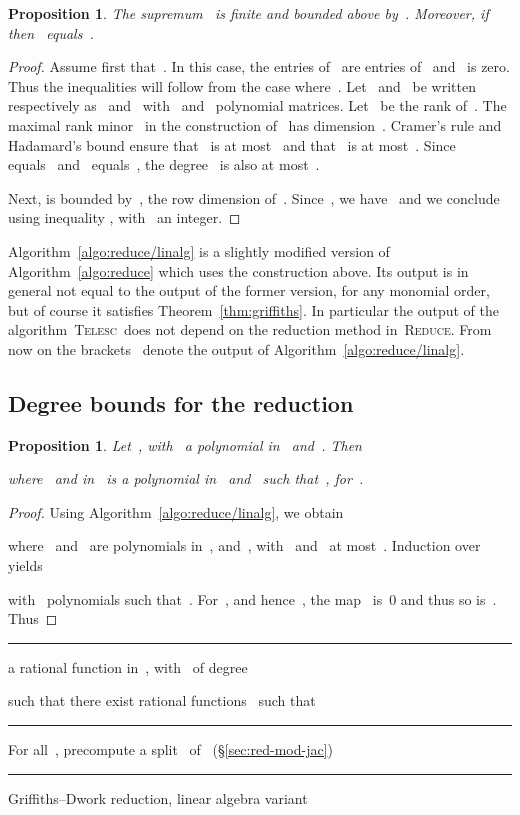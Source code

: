 \documentclass{sig-alternate}
\newtheorem{prop}[thm]{Proposition}
\newenvironment{algoenv}[3][\linewidth]{
\begin{minipage}{#1}\flushleft
\rule{\textwidth}{.08em}\vspace{-\baselineskip}\smallskip
\begin{description}[noitemsep]
\item[\rlap{Input}\phantom{Output}] #2
\item[Output] #3
\end{description}
\vspace{-\baselineskip}
\rule{\textwidth}{.05em}
\begin{algorithmic}
}{\end{algorithmic}
\vspace{-.5\baselineskip}
\rule{\textwidth}{.08em}
\end{minipage}}
\newcommand{\tReduce}{\textsc{Reduce}}
\newcommand{\tCreatTel}{\textsc{Telesc}}
\begin{document}
\begin{prop}\label{prop:deltaE}
  The supremum~ is finite and bounded above by~. 
  Moreover, if~ then~ equals~.
\end{prop}

\begin{proof}
  Assume first that~.
  In this case, the entries of~ are entries of~ and~ is zero.
  Thus the inequalities will follow from the case where~. 
  Let~ and~ be written respectively as~ and~ with~ and~ polynomial matrices.
  Let~ be the rank of~.
  The maximal rank minor~ in the construction of~ has dimension~.
  Cramer's rule and Hadamard's bound ensure that~ is at most~ and that~ is at most~.
  Since~ equals~ and~ equals~, the degree~ is also at most~.

Next,  is bounded by~, the row dimension of~.
Since~, we have~ and we conclude using  inequality 
, with~ an integer.
\end{proof}

Algorithm~\ref{algo:reduce/linalg} is a slightly modified version of Algorithm~\ref{algo:reduce} which uses 
the construction above. Its output is in general not equal to the output of the former version, for any monomial order, but of course it satisfies Theorem~\ref{thm:griffiths}. In particular the output of the algorithm~\tCreatTel\ does not depend on the reduction method in~\tReduce.
From now on the brackets~ denote the output of Algorithm~\ref{algo:reduce/linalg}.

\subsection{Degree bounds for the reduction}

\begin{prop}\label{prop:bound-denom}
Let~, with~ a polynomial in~ and~. Then

where~ and  in~ is a polynomial in~ and~ such that~, for~.
\end{prop}

\begin{proof}
Using Algorithm~\ref{algo:reduce/linalg}, we obtain
  
where~ and~ are polynomials in~,  and~, with~ and~ at most~.
Induction over~ yields
  
with~ polynomials such that~.
  For~, and hence~, the map~ is~0 and thus so is~.
  Thus
  
\end{proof}

\begin{algo}
\centering
\begin{algoenv}{
 a rational function in~, with~ of degree~ }{ such that there exist rational functions~ such that }
  \State For all~, precompute a split~ of~ (\S\ref{sec:red-mod-jac})
  \If{}
\Return 
  \EndIf
  \State 
 
  \State \Return 
   \EndProcedure

\end{algoenv}
\caption{Griffiths--Dwork reduction, linear algebra variant}
\label{algo:reduce/linalg}
\end{algo}
\end{document}
